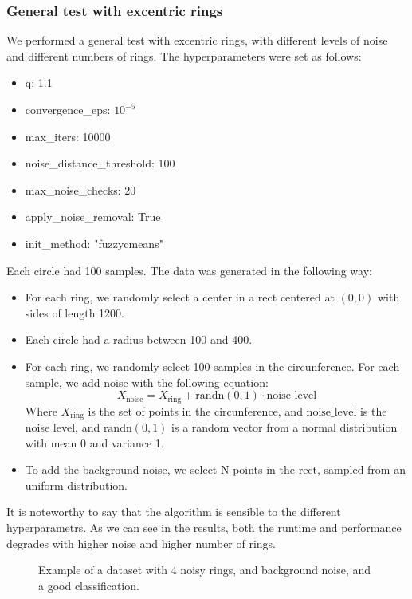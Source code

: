 \documentclass[conference]{IEEEtran}
\begin{document}
\subsubsection{General test with excentric rings}
We performed a general test with excentric rings, with different levels of noise and different numbers of rings.
The hyperparameters were set as follows:

\begin{itemize}
    \item q: 1.1
    \item convergence\_eps: $10^{-5}$
    \item max\_iters: 10000
    \item noise\_distance\_threshold: 100
    \item max\_noise\_checks: 20
    \item apply\_noise\_removal: True
    \item init\_method: "fuzzycmeans"
\end{itemize}

Each circle had 100 samples.
The data was generated in the following way:
\begin{itemize}
    \item For each ring, we randomly select a center in a rect centered at $(0, 0)$ with sides of length 1200.
    \item Each circle had a radius between 100 and 400.
    \item For each ring, we randomly select 100 samples in the circunference. For each sample, we add noise with the following equation:
    \begin{equation}
        X_{\text{noise}} = X_{\text{ring}} + \text{randn}(0, 1) \cdot \text{noise\_level}
    \end{equation}
    Where $X_{\text{ring}}$ is the set of points in the circunference, and $\text{noise\_level}$ is the noise level, and $\text{randn}(0, 1)$ is a random vector from a normal distribution with mean 0 and variance 1.
    \item To add the background noise, we select N points in the rect, sampled from an uniform distribution.
\end{itemize}

It is noteworthy to say that the algorithm is sensible to the different hyperparametrs.
As we can see in the results, both the runtime and performance degrades with higher noise and higher number of rings.
\begin{figure}[H]
    \centering
    \resizebox{0.9\linewidth}{!}{}
    \label{fig:excentric_rings}
    \caption{Example of a dataset with 4 noisy rings, and background noise, and a good classification.}
\end{figure}
\end{document}
